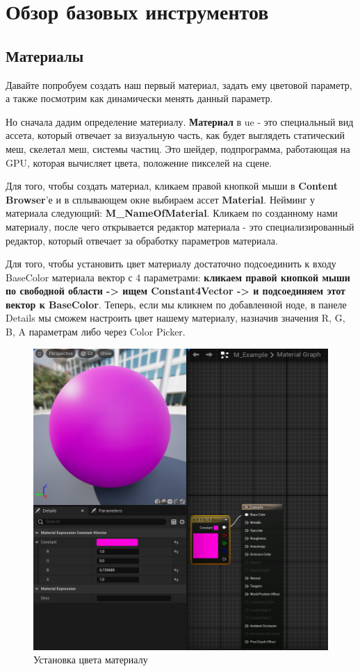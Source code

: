 \newpage

\section{Обзор базовых инструментов}
\subsection{Материалы}
Давайте попробуем создать наш первый материал, задать ему цветовой параметр, а 
также посмотрим как динамически менять данный параметр.

Но сначала дадим определение материалу. \textbf{Материал} в ue - это
специальный вид ассета, который отвечает за визуальную часть, как будет
выглядеть статический меш, скелетал меш, системы частиц. Это шейдер, подпрограмма, 
работающая на GPU, которая вычисляет цвета, положение пикселей на сцене.

Для того, чтобы создать материал, кликаем правой кнопкой мыши в 
\textbf{Content Browser}'е и в сплывающем окне выбираем ассет \textbf{Material}.
Нейминг у материала следующий: \textbf{M\_NameOfMaterial}. Кликаем по созданному нами 
материалу, после чего открывается редактор материала - это специализированный
редактор, который отвечает за обработку параметров материала.

Для того, чтобы установить цвет материалу достаточно подсоединить к входу BaseColor
материала вектор с 4 параметрами: \textbf{кликаем правой кнопкой мыши по свободной
области -> ищем Constant4Vector -> и подсоединяем этот вектор к BaseColor}.
Теперь, если мы кликнем по добавленной ноде, в панеле Details мы сможем
настроить цвет нашему материалу, назначив значения R, G, B, A параметрам либо
через Color Picker.

\begin{figure}[h]
    \centering
    \includegraphics[width=\textwidth]{Lections/Lection_2/BaseColorMaterial.png}
    \caption{Установка цвета материалу}
\end{figure}

